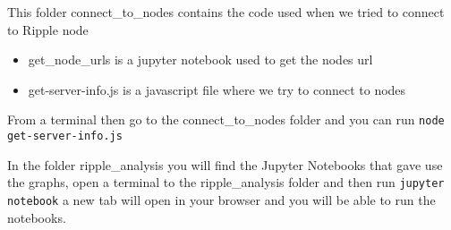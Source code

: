 \vspace{\baselineskip}
This folder connect\_to\_nodes contains the code used when we tried to connect to Ripple node
\begin{itemize}
\item get\_node\_urls is a jupyter notebook used to get the nodes url
\item get-server-info.js is a javascript file where we try to connect to nodes
\end{itemize}

From a terminal then go to the connect\_to\_nodes folder and you can run \texttt{node get-server-info.js}
\vspace{\baselineskip}

In the folder ripple\_analysis you will find the Jupyter Notebooks that gave use the graphs, open a terminal to the ripple\_analysis folder and then run \texttt{jupyter notebook} a new tab will open in your browser and you will be able to run the notebooks.
